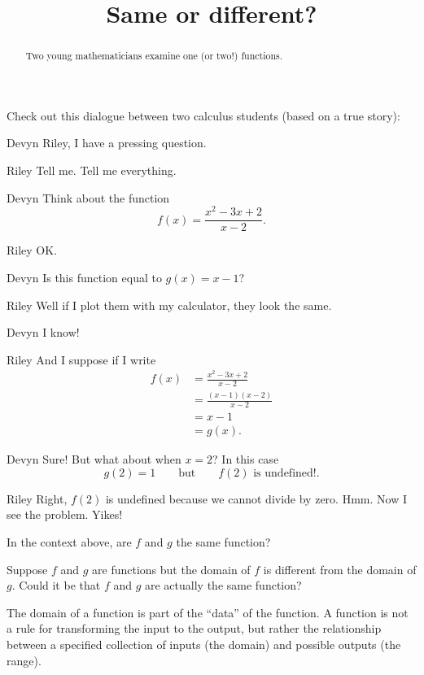 \documentclass{ximera}
\title[Break-Ground:]{Same or different?}
\begin{document}
\begin{abstract}
  Two young mathematicians examine one (or two!)  functions.
\end{abstract}
\maketitle

Check out this dialogue between two calculus students (based on a true
story):

\begin{dialogue}
\item[Devyn] Riley, I have a pressing question.
\item[Riley] Tell me. Tell me everything.
\item[Devyn] Think about the function
  \[
  f(x) = \frac{x^2 - 3x + 2}{x-2}.
  \]
\item[Riley] OK.
\item[Devyn] Is this function equal to $g(x) = x-1$?
\item[Riley] Well if I plot them with my calculator, they look the
  same.
\item[Devyn] I know!
\item[Riley] And I suppose if I write
  \begin{align*}
    f(x) &= \frac{x^2 - 3x + 2}{x-2} \\
    &= \frac{(x-1)(x-2)}{x-2} \\
    &= x-1 \\
    &= g(x).
  \end{align*}
\item[Devyn] Sure! But what about when $x=2$? In this case
  \[
  g(2) = 1\qquad\text{but}\qquad f(2) \text{ is undefined!}.
  \]
\item[Riley] Right, $f(2)$ is undefined because we cannot divide by
  zero. Hmm. Now I see the problem. Yikes!
\end{dialogue}

\begin{problem}
  In the context above, are $f$ and $g$ the same function?
  \begin{multipleChoice}
  \end{multipleChoice}
\end{problem}



\begin{problem}
  Suppose $f$ and $g$ are functions but the domain of $f$ is different
  from the domain of $g$.  Could it be that $f$ and $g$ are actually
  the same function?

  \begin{multipleChoice}
  \end{multipleChoice}

  \begin{feedback}
    The domain of a function is part of the ``data'' of the function.
    A function is not a rule for transforming the input to the output,
    but rather the relationship between a specified collection of
    inputs (the domain) and possible outputs (the range).
  \end{feedback}
\end{problem}
\end{document}
